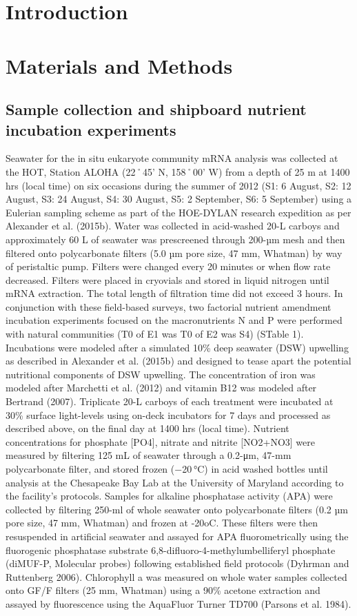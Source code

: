 \section{Introduction}

\section{Materials and Methods}
\subsection{Sample collection and shipboard nutrient incubation experiments}
Seawater for the in situ eukaryote community mRNA analysis was collected at the HOT, Station ALOHA (22˚45’ N, 158˚00’ W) from a depth of 25 m at 1400 hrs (local time) on six occasions during the summer of 2012 (S1: 6 August, S2: 12 August, S3: 24 August, S4: 30 August, S5: 2 September, S6: 5 September) using a Eulerian sampling scheme as part of the HOE-DYLAN research expedition as per Alexander et al. (2015b). Water was collected in acid-washed 20-L carboys and approximately 60 L of seawater was prescreened through 200-µm mesh and then filtered onto polycarbonate filters (5.0 µm pore size, 47 mm, Whatman) by way of peristaltic pump. Filters were changed every 20 minutes or when flow rate decreased. Filters were placed in cryovials and stored in liquid nitrogen until mRNA extraction. The total length of filtration time did not exceed 3 hours. 
In conjunction with these field-based surveys, two factorial nutrient amendment incubation experiments focused on the macronutrients N and P were performed with natural communities (T0 of E1 was T0 of E2 was S4) (STable 1). Incubations were modeled after a simulated 10\% deep seawater (DSW) upwelling as described in Alexander et al. (2015b) and designed to tease apart the potential nutritional components of DSW upwelling. The concentration of iron was modeled after Marchetti et al. (2012) and vitamin B12 was modeled after Bertrand (2007). Triplicate 20-L carboys of each treatment were incubated at 30\% surface light-levels using on-deck incubators for 7 days and processed as described above, on the final day at 1400 hrs (local time). Nutrient concentrations for phosphate [PO4], nitrate and nitrite [NO2+NO3] were measured by filtering 125 mL of seawater through a 0.2-μm, 47-mm polycarbonate filter, and stored frozen (−20 °C) in acid washed bottles until analysis at the Chesapeake Bay Lab at the University of Maryland according to the facility's protocols. Samples for alkaline phosphatase activity (APA) were collected by filtering 250-ml of whole seawater onto polycarbonate filters (0.2 µm pore size, 47 mm, Whatman) and frozen at -20oC. These filters were then resuspended in artificial seawater and assayed for APA fluorometrically using the fluorogenic phosphatase substrate 6,8-difluoro-4-methylumbelliferyl phosphate (diMUF-P, Molecular probes) following established field protocols (Dyhrman and Ruttenberg 2006). Chlorophyll a was measured on whole water samples collected onto GF/F filters (25 mm, Whatman) using a 90\% acetone extraction and assayed by fluorescence using the AquaFluor Turner TD700 (Parsons et al. 1984).
